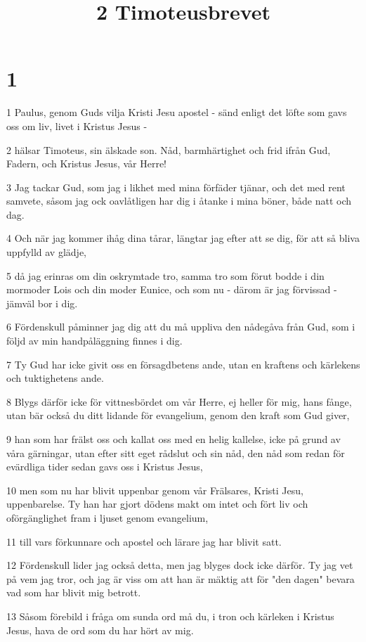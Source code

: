 

\title{2 Timoteusbrevet}


\chapter{1}

\par 1 Paulus, genom Guds vilja Kristi Jesu apostel - sänd enligt det löfte som gavs oss om liv, livet i Kristus Jesus -
\par 2 hälsar Timoteus, sin älskade son. Nåd, barmhärtighet och frid ifrån Gud, Fadern, och Kristus Jesus, vår Herre!
\par 3 Jag tackar Gud, som jag i likhet med mina förfäder tjänar, och det med rent samvete, såsom jag ock oavlåtligen har dig i åtanke i mina böner, både natt och dag.
\par 4 Och när jag kommer ihåg dina tårar, längtar jag efter att se dig, för att så bliva uppfylld av glädje,
\par 5 då jag erinras om din oskrymtade tro, samma tro som förut bodde i din mormoder Lois och din moder Eunice, och som nu - därom är jag förvissad - jämväl bor i dig.
\par 6 Fördenskull påminner jag dig att du må uppliva den nådegåva från Gud, som i följd av min handpåläggning finnes i dig.
\par 7 Ty Gud har icke givit oss en försagdbetens ande, utan en kraftens och kärlekens och tuktighetens ande.
\par 8 Blygs därför icke för vittnesbördet om vår Herre, ej heller för mig, hans fånge, utan bär också du ditt lidande för evangelium, genom den kraft som Gud giver,
\par 9 han som har frälst oss och kallat oss med en helig kallelse, icke på grund av våra gärningar, utan efter sitt eget rådslut och sin nåd, den nåd som redan för evärdliga tider sedan gavs oss i Kristus Jesus,
\par 10 men som nu har blivit uppenbar genom vår Frälsares, Kristi Jesu, uppenbarelse. Ty han har gjort dödens makt om intet och fört liv och oförgänglighet fram i ljuset genom evangelium,
\par 11 till vars förkunnare och apostel och lärare jag har blivit satt.
\par 12 Fördenskull lider jag också detta, men jag blyges dock icke därför. Ty jag vet på vem jag tror, och jag är viss om att han är mäktig att för "den dagen" bevara vad som har blivit mig betrott.
\par 13 Såsom förebild i fråga om sunda ord må du, i tron och kärleken i Kristus Jesus, hava de ord som du har hört av mig.
